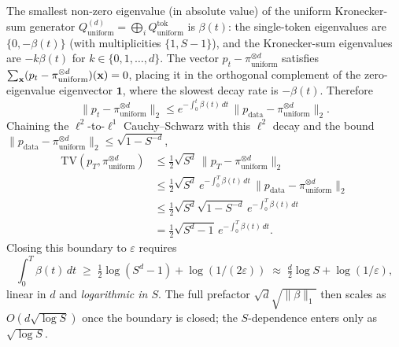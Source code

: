 \documentclass{article} %
\newcommand{\bfx}{{\bf x}}
\newcommand{\TV}{\mathrm{TV}}
\begin{document}
The smallest non-zero eigenvalue (in absolute value) of the uniform
Kronecker-sum generator $Q^{(d)}_{\mathrm{uniform}} = \bigoplus_i Q^{\mathrm{tok}}_{\mathrm{uniform}}$
is $\beta(t)$: the single-token eigenvalues are $\{0, -\beta(t)\}$ (with
multiplicities $\{1, S-1\}$), and the Kronecker-sum eigenvalues are
$-k\beta(t)$ for $k \in \{0, 1, \ldots, d\}$. The vector
$p_t - \pi_{\mathrm{uniform}}^{\otimes d}$ satisfies
$\sum_\bfx (p_t - \pi_{\mathrm{uniform}}^{\otimes d})(\bfx) = 0$, placing it
in the orthogonal complement of the zero-eigenvalue eigenvector $\mathbf{1}$,
where the slowest decay rate is $-\beta(t)$. Therefore
\begin{equation}
\|p_t - \pi_{\mathrm{uniform}}^{\otimes d}\|_2 \le e^{-\int_0^t \beta(t)\,dt}\,\|p_{\mathrm{data}} - \pi_{\mathrm{uniform}}^{\otimes d}\|_2.
\end{equation}
Chaining the $\ell^2$-to-$\ell^1$ Cauchy--Schwarz with this $\ell^2$ decay
and the bound $\|p_{\mathrm{data}} - \pi_{\mathrm{uniform}}^{\otimes d}\|_2 \le \sqrt{1 - S^{-d}}$,
\begin{align}
\TV(p_T, \pi_{\mathrm{uniform}}^{\otimes d})
&\le \tfrac{1}{2}\sqrt{S^d}\,\|p_T - \pi_{\mathrm{uniform}}^{\otimes d}\|_2 \\
&\le \tfrac{1}{2}\sqrt{S^d}\,e^{-\int_0^T \beta(t)\,dt}\,\|p_{\mathrm{data}} - \pi_{\mathrm{uniform}}^{\otimes d}\|_2 \\
&\le \tfrac{1}{2}\sqrt{S^d}\sqrt{1 - S^{-d}}\,e^{-\int_0^T \beta(t)\,dt} \\
&= \tfrac{1}{2}\sqrt{S^d - 1}\,e^{-\int_0^T \beta(t)\,dt}.
\end{align}
Closing this boundary to $\varepsilon$ requires
\begin{equation}
\int_0^T \beta(t)\,dt \;\ge\; \tfrac{1}{2}\log(S^d - 1) + \log(1/(2\varepsilon)) \;\approx\; \tfrac{d}{2}\log S + \log(1/\varepsilon),
\end{equation}
linear in $d$ and \emph{logarithmic in $S$}. The full prefactor
$\sqrt{d}\sqrt{\|\beta\|_1}$ then scales as $O(d\sqrt{\log S})$ once the
boundary is closed; the $S$-dependence enters only as $\sqrt{\log S}$.
\fi 
\end{document}
